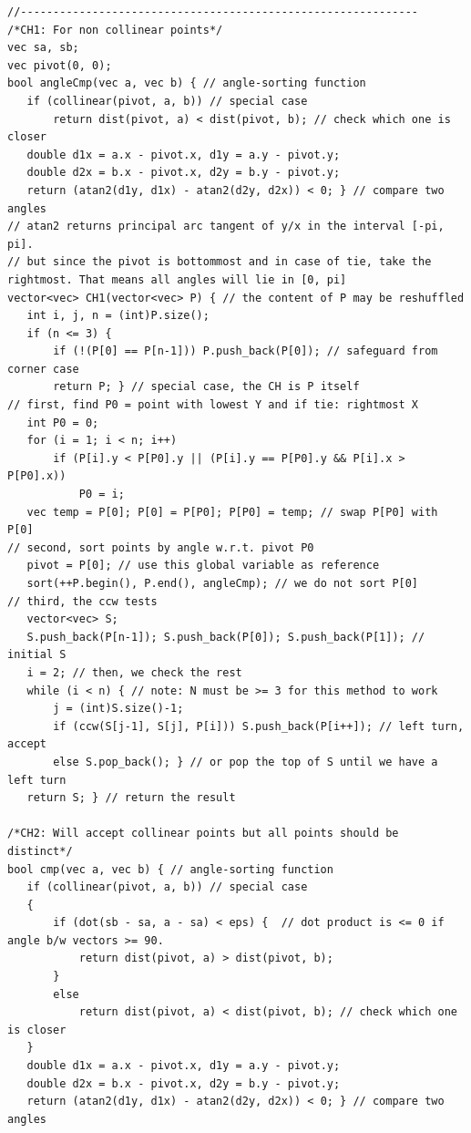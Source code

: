 \documentclass[8pt, a4paper, oneside, twocolumn]{extarticle}
\begin{document}
\begin{verbatim}
//-------------------------------------------------------------
/*CH1: For non collinear points*/
vec sa, sb;
vec pivot(0, 0);
bool angleCmp(vec a, vec b) { // angle-sorting function
   if (collinear(pivot, a, b)) // special case
       return dist(pivot, a) < dist(pivot, b); // check which one is closer
   double d1x = a.x - pivot.x, d1y = a.y - pivot.y;
   double d2x = b.x - pivot.x, d2y = b.y - pivot.y;
   return (atan2(d1y, d1x) - atan2(d2y, d2x)) < 0; } // compare two angles
// atan2 returns principal arc tangent of y/x in the interval [-pi, pi].
// but since the pivot is bottommost and in case of tie, take the rightmost. That means all angles will lie in [0, pi]
vector<vec> CH1(vector<vec> P) { // the content of P may be reshuffled
   int i, j, n = (int)P.size();
   if (n <= 3) {
       if (!(P[0] == P[n-1])) P.push_back(P[0]); // safeguard from corner case
       return P; } // special case, the CH is P itself
// first, find P0 = point with lowest Y and if tie: rightmost X
   int P0 = 0;
   for (i = 1; i < n; i++)
       if (P[i].y < P[P0].y || (P[i].y == P[P0].y && P[i].x > P[P0].x))
           P0 = i;
   vec temp = P[0]; P[0] = P[P0]; P[P0] = temp; // swap P[P0] with P[0]
// second, sort points by angle w.r.t. pivot P0
   pivot = P[0]; // use this global variable as reference
   sort(++P.begin(), P.end(), angleCmp); // we do not sort P[0]
// third, the ccw tests
   vector<vec> S;
   S.push_back(P[n-1]); S.push_back(P[0]); S.push_back(P[1]); // initial S
   i = 2; // then, we check the rest
   while (i < n) { // note: N must be >= 3 for this method to work
       j = (int)S.size()-1;
       if (ccw(S[j-1], S[j], P[i])) S.push_back(P[i++]); // left turn, accept
       else S.pop_back(); } // or pop the top of S until we have a left turn
   return S; } // return the result

/*CH2: Will accept collinear points but all points should be distinct*/
bool cmp(vec a, vec b) { // angle-sorting function
   if (collinear(pivot, a, b)) // special case
   {
       if (dot(sb - sa, a - sa) < eps) {  // dot product is <= 0 if angle b/w vectors >= 90.
           return dist(pivot, a) > dist(pivot, b);
       }
       else
           return dist(pivot, a) < dist(pivot, b); // check which one is closer
   }
   double d1x = a.x - pivot.x, d1y = a.y - pivot.y;
   double d2x = b.x - pivot.x, d2y = b.y - pivot.y;
   return (atan2(d1y, d1x) - atan2(d2y, d2x)) < 0; } // compare two angles


\end{verbatim}
\end{document}

